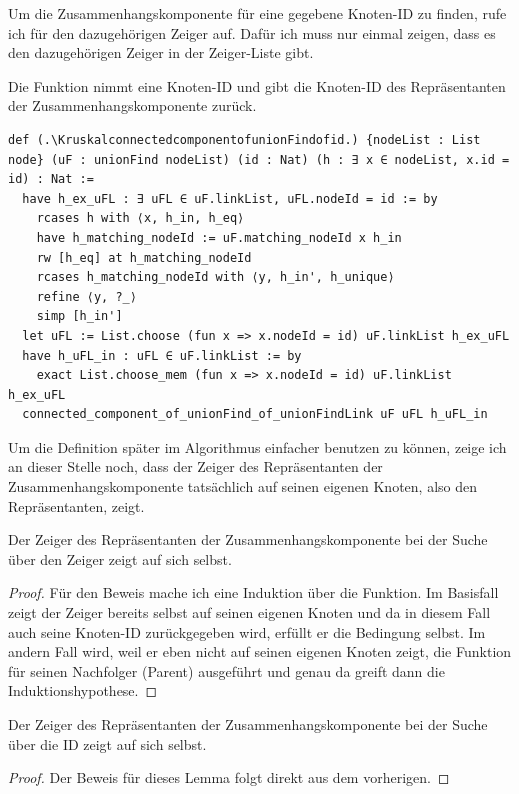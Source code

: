 Um die Zusammenhangskomponente für eine gegebene Knoten-ID zu finden, rufe ich \KruskalconnectedcomponentofunionFindofunionFindLink für den dazugehörigen Zeiger auf.
Dafür ich muss nur einmal zeigen, dass es den dazugehörigen Zeiger in der Zeiger-Liste gibt.

\begin{definition}[\KruskalconnectedcomponentofunionFindofid]
  Die Funktion nimmt eine Knoten-ID und gibt die Knoten-ID des Repräsentanten der Zusammenhangskomponente zurück.
\end{definition}
\newpage
\begin{lstlisting}
def (.\KruskalconnectedcomponentofunionFindofid.) {nodeList : List node} (uF : unionFind nodeList) (id : Nat) (h : ∃ x ∈ nodeList, x.id = id) : Nat :=
  have h_ex_uFL : ∃ uFL ∈ uF.linkList, uFL.nodeId = id := by
    rcases h with ⟨x, h_in, h_eq⟩
    have h_matching_nodeId := uF.matching_nodeId x h_in
    rw [h_eq] at h_matching_nodeId
    rcases h_matching_nodeId with ⟨y, h_in', h_unique⟩
    refine ⟨y, ?_⟩
    simp [h_in']
  let uFL := List.choose (fun x => x.nodeId = id) uF.linkList h_ex_uFL
  have h_uFL_in : uFL ∈ uF.linkList := by
    exact List.choose_mem (fun x => x.nodeId = id) uF.linkList h_ex_uFL
  connected_component_of_unionFind_of_unionFindLink uF uFL h_uFL_in
\end{lstlisting}

Um die Definition später im Algorithmus einfacher benutzen zu können, zeige ich an dieser Stelle noch,
dass der Zeiger des Repräsentanten der Zusammenhangskomponente tatsächlich auf seinen eigenen Knoten, also den Repräsentanten, zeigt.

\begin{lemma}[\KruskalexistunionFindLinkofconnectedcomponentofunionFindofunionFindLink]
  Der Zeiger des Repräsentanten der Zusammenhangskomponente bei der Suche über den Zeiger zeigt auf sich selbst.
\end{lemma}
\begin{proof}
  Für den Beweis mache ich eine Induktion über die Funktion.
  Im Basisfall zeigt der Zeiger bereits selbst auf seinen eigenen Knoten und da in diesem Fall auch seine Knoten-ID zurückgegeben wird, erfüllt er die Bedingung selbst.
  Im andern Fall wird, weil er eben nicht auf seinen eigenen Knoten zeigt, die Funktion für seinen Nachfolger (Parent) ausgeführt und genau da greift dann die Induktionshypothese.
\end{proof}

\begin{lemma}[\KruskalexistunionFindLinkofconnectedcomponentofunionFindofid]\label{KruskalexistunionFindLinkofconnectedcomponentofunionFindofid}
  Der Zeiger des Repräsentanten der Zusammenhangskomponente bei der Suche über die ID zeigt auf sich selbst.
\end{lemma}
\begin{proof}
  Der Beweis für dieses Lemma folgt direkt aus dem vorherigen.
\end{proof}



